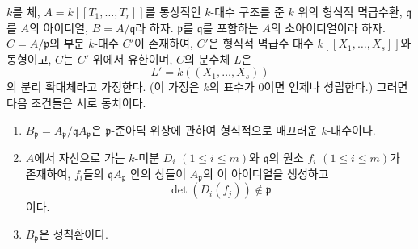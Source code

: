 \begin{proposition}[22.7.2]
\label{0.22.7.2-ko}
$k$를 체, $A=k[[T_1,\ldots,T_r]]$를 통상적인 $k$-대수 구조를 준
$k$ 위의 형식적 멱급수환, $\mathfrak q$를 $A$의 아이디얼,
$B=A/\mathfrak q$라 하자. $\mathfrak p$를 $\mathfrak q$를 포함하는
$A$의 소아이디얼이라 하자. $C=A/\mathfrak p$의 부분 $k$-대수
$C'$이 존재하여, $C'$은 형식적 멱급수 대수
$k[[X_1,\ldots,X_s]]$와 동형이고, $C$는 $C'$ 위에서 유한이며,
$C$의 분수체 $L$은
\[
  L'=k((X_1,\ldots,X_s))
\]
의 분리 확대체라고 가정한다. (이 가정은 $k$의 표수가 $0$이면
언제나 성립한다.) 그러면 다음 조건들은 서로 동치이다.
\begin{enumerate}
  \item[a)] $B_{\mathfrak p}
  =A_{\mathfrak p}/\mathfrak qA_{\mathfrak p}$은
  $\mathfrak p$-준아딕 위상에 관하여 형식적으로 매끄러운
  $k$-대수이다.
  \item[b)] $A$에서 자신으로 가는 $k$-미분
  $D_i$ $(1\leq i\leq m)$와 $\mathfrak q$의 원소
  $f_i$ $(1\leq i\leq m)$가 존재하여, $f_i$들의
  $\mathfrak qA_{\mathfrak p}$ 안의 상들이 $A_{\mathfrak p}$의 이
  아이디얼을 생성하고
  \[
    \det(D_i(f_j))\notin\mathfrak p
  \]
  이다.
  \item[c)] $B_{\mathfrak p}$은 정칙환이다.
\end{enumerate}
\end{proposition}

